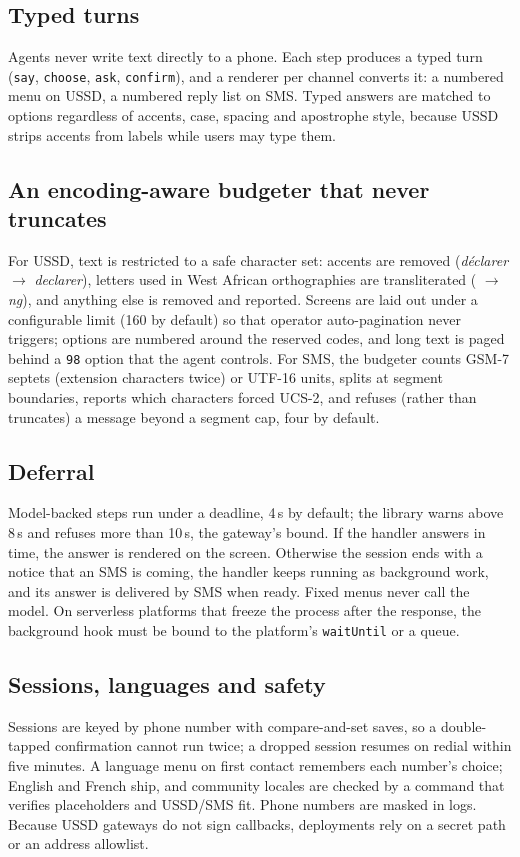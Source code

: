 \documentclass[conference]{IEEEtran}
\begin{document}
\subsection{Typed turns}
Agents never write text directly to a phone. Each step produces a typed turn
(\texttt{say}, \texttt{choose}, \texttt{ask}, \texttt{confirm}), and a
renderer per channel converts it: a numbered menu on USSD, a numbered reply
list on SMS. Typed answers are matched to options regardless of accents,
case, spacing and apostrophe style, because USSD strips accents from labels
while users may type them.

\subsection{An encoding-aware budgeter that never truncates}
For USSD, text is restricted to a safe character set: accents are removed
(\textit{d\'eclarer} $\rightarrow$ \textit{declarer}), letters used in West
African orthographies are transliterated (\textit{\ng} $\rightarrow$
\textit{ng}), and anything else is removed and reported. Screens are laid out
under a configurable limit (160 by default) so that operator
auto-pagination never triggers; options are numbered around the reserved
codes, and long text is paged behind a \texttt{98} option that the agent
controls. For SMS, the budgeter counts GSM-7 septets (extension characters
twice) or UTF-16 units, splits at segment boundaries, reports which characters
forced UCS-2, and refuses (rather than truncates) a message beyond a segment
cap, four by default.

\subsection{Deferral}
Model-backed steps run under a deadline, 4\,s by default; the library warns
above 8\,s and refuses more than 10\,s, the gateway's bound. If the handler
answers in time, the answer is rendered on the screen. Otherwise the session
ends with a notice that an SMS is coming, the handler keeps running as
background work, and its answer is delivered by SMS when ready. Fixed menus
never call the model. On serverless platforms that freeze the process after
the response, the background hook must be bound to the platform's
\texttt{waitUntil} or a queue.

\subsection{Sessions, languages and safety}
Sessions are keyed by phone number with compare-and-set saves, so a
double-tapped confirmation cannot run twice; a dropped session resumes on
redial within five minutes. A language menu on first contact remembers each
number's choice; English and French ship, and community locales are checked
by a command that verifies placeholders and USSD/SMS fit. Phone numbers are
masked in logs. Because USSD gateways do not sign callbacks, deployments rely
on a secret path or an address allowlist.
\end{document}
